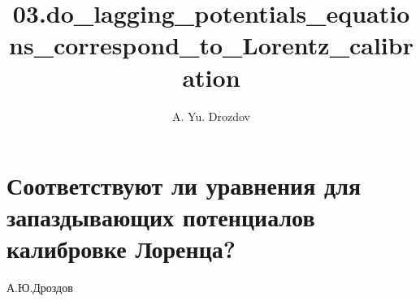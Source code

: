 \documentclass[11pt]{article}
\author{A. Yu. Drozdov}
\title{03.do\_lagging\_potentials\_equations\_correspond\_to\_Lorentz\_calibration}
\begin{document}
    
    \maketitle
    
    

    
    \section{Соответствуют ли уравнения для запаздывающих потенциалов
калибровке
Лоренца?}\label{ux441ux43eux43eux442ux432ux435ux442ux441ux442ux432ux443ux44eux442-ux43bux438-ux443ux440ux430ux432ux43dux435ux43dux438ux44f-ux434ux43bux44f-ux437ux430ux43fux430ux437ux434ux44bux432ux430ux44eux449ux438ux445-ux43fux43eux442ux435ux43dux446ux438ux430ux43bux43eux432-ux43aux430ux43bux438ux431ux440ux43eux432ux43aux435-ux43bux43eux440ux435ux43dux446ux430}

    А.Ю.Дроздов
\end{document}
